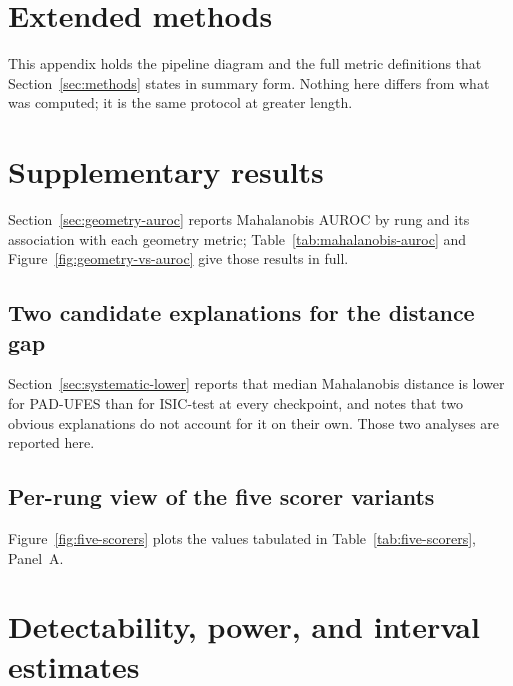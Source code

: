 \appendix

\section{Extended methods}
\label{app:methods}

This appendix holds the pipeline diagram and the full metric definitions that
Section~\ref{sec:methods} states in summary form. Nothing here differs from what
was computed; it is the same protocol at greater length.





\section{Supplementary results}
\label{app:results-extra}

Section~\ref{sec:geometry-auroc} reports Mahalanobis AUROC by rung and its
association with each geometry metric; Table~\ref{tab:mahalanobis-auroc} and
Figure~\ref{fig:geometry-vs-auroc} give those results in full.



\subsection{Two candidate explanations for the distance gap}
\label{app:norm-majority}

Section~\ref{sec:systematic-lower} reports that median Mahalanobis distance is
lower for PAD-UFES than for ISIC-test at every checkpoint, and notes that two
obvious explanations do not account for it on their own. Those two analyses are
reported here.



\subsection{Per-rung view of the five scorer variants}
\label{app:five-scorers-figure}

Figure~\ref{fig:five-scorers} plots the values tabulated in Table~\ref{tab:five-scorers}, Panel~A.



\section{Detectability, power, and interval estimates}
\label{app:power}

